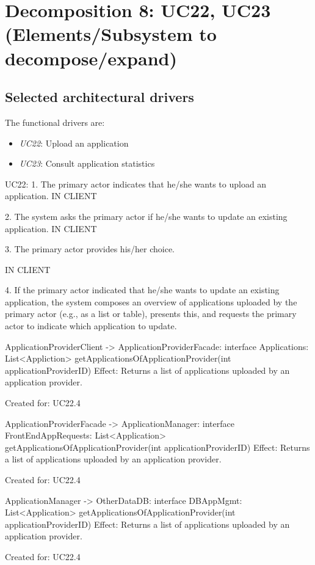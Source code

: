 \section{Decomposition 8: UC22, UC23 (Elements/Subsystem to decompose/expand)}


\subsection*{Selected architectural drivers}
    The functional drivers are:
    \begin{itemize}
        \item \emph{UC22}: Upload an application
        \item \emph{UC23}: Consult application statistics
    \end{itemize}

    UC22:
        1. The primary actor indicates that he/she wants to upload an application.
            IN CLIENT

        2. The system asks the primary actor if he/she wants to update an existing application.
            IN CLIENT

        3. The primary actor provides his/her choice.

            IN CLIENT

        4. If the primary actor indicated that he/she wants to update an existing application,
           the system composes an overview of applications uploaded by the primary actor
           (e.g., as a list or table), presents this, and requests the primary actor to indicate which application to update.

            ApplicationProviderClient -> ApplicationProviderFacade: interface Applications: List<Appliction> getApplicationsOfApplicationProvider(int applicationProviderID)
                Effect: Returns a list of applications uploaded by an application provider.
                \item Created for: UC22.4

            ApplicationProviderFacade -> ApplicationManager: interface FrontEndAppRequests: List<Application> getApplicationsOfApplicationProvider(int applicationProviderID)
                Effect: Returns a list of applications uploaded by an application provider.
                \item Created for: UC22.4

            ApplicationManager -> OtherDataDB: interface DBAppMgmt: List<Application> getApplicationsOfApplicationProvider(int applicationProviderID)
                Effect: Returns a list of applications uploaded by an application provider.
                \item Created for: UC22.4


